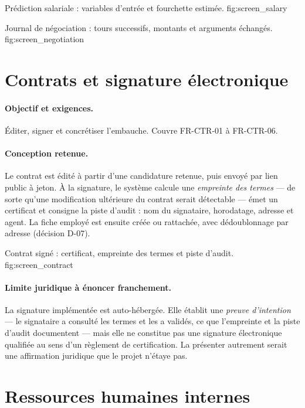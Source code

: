   {Prédiction salariale : variables d'entrée et fourchette estimée.}
  {fig:screen_salary}

  {Journal de négociation : tours successifs, montants et arguments échangés.}
  {fig:screen_negotiation}

\section{Contrats et signature électronique}
\label{sec:impl_contracts}

\paragraph{Objectif et exigences.} Éditer, signer et concrétiser l'embauche.
Couvre FR-CTR-01 à FR-CTR-06.

\paragraph{Conception retenue.} Le contrat est édité à partir d'une candidature
retenue, puis envoyé par lien public à jeton. À la signature, le système
calcule une \emph{empreinte des termes} — de sorte qu'une modification
ultérieure du contrat serait détectable — émet un certificat et consigne la
piste d'audit : nom du signataire, horodatage, adresse et agent. La fiche
employé est ensuite créée ou rattachée, avec dédoublonnage par adresse
(décision D-07).

  {Contrat signé : certificat, empreinte des termes et piste d'audit.}
  {fig:screen_contract}

\paragraph{Limite juridique à énoncer franchement.} La signature implémentée
est auto-hébergée. Elle établit une \emph{preuve d'intention} — le signataire a
consulté les termes et les a validés, ce que l'empreinte et la piste d'audit
documentent — mais elle ne constitue pas une signature électronique qualifiée
au sens d'un règlement de certification. La présenter autrement serait une
affirmation juridique que le projet n'étaye pas.

\section{Ressources humaines internes}
\label{sec:impl_hr}

